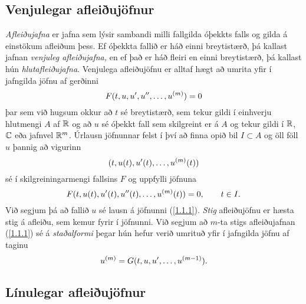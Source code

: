\subsection*{Venjulegar afleiðujöfnur}

{\it Afleiðujafna} er  jafna sem lýsir
sambandi milli fallgilda óþekkts falls og gilda á einstökum 
afleiðum þess.  Ef óþekkta fallið er háð einni breytistærð, 
þá kallast jafnan {\it venjuleg afleiðujafna,
} 
en ef það er háð fleiri en einni breytistærð, þá
kallast hún {\it hlutafleiðujafna}.  
Venjulega afleiðujöfnu er alltaf hægt að umrita yfir í jafngilda jöfnu
af gerðinni
\begin{equation*}
F(t,u,u',u{\sp{\prime\prime}},\dots,u\sp{(m)})=0 \label{1.1.1}
\end{equation*}
þar sem við hugsum okkur að $t$ sé breytistærð, sem tekur gildi í
einhverju hlutmengi $A$ af ${\mathbb R}$ og að $u$ sé óþekkt fall sem skilgreint er
á $A$ og tekur gildi í ${\mathbb R}$, ${\mathbb C}$ eða jafnvel ${\mathbb R}^m$.  
Úrlausn jöfnunnar felst í því að finna opið bil $I\subset A$ og
öll föll $u$ þannig að vigurinn
 \begin{equation*}(t,u(t),u{\sp{\prime}}(t),\dots,u\sp{(m)}(t))\label{1.1.2}
 \end{equation*}
sé í skilgreiningarmengi fallsins $F$ og uppfylli jöfnuna
 \begin{equation*}F(t,u(t),u'(t),u{\sp{\prime\prime}}(t),\dots,u\sp{(m)}(t))=0,
 \qquad t\in I.\label{1.1.3}
 \end{equation*}
Við  segjum  þá að fallið $u$ sé lausn á jöfnunni (\ref{1.1.1}).
{\it Stig}
afleiðujöfnu er hæsta stig á afleiðu, sem
kemur fyrir í jöfnunni.  
Við segjum að $m$-ta stigs afleiðujafnan (\ref{1.1.1}) sé á 
{\it staðalformi}
þegar hún hefur verið umrituð yfir í jafngilda jöfnu af taginu
 \begin{equation*}u\sp{(m)}=G(t,u,u',\dots,u\sp{(m-1)}).\label{1.1.4}
 \end{equation*}

\subsection*{Línulegar afleiðujöfnur}

